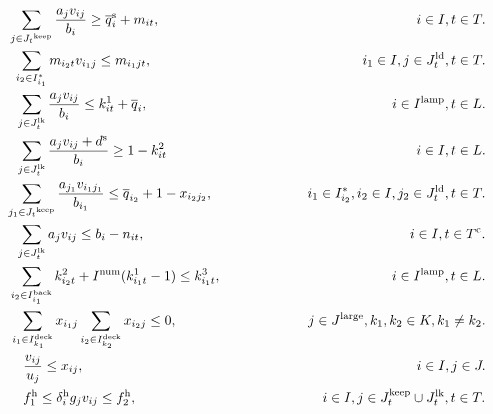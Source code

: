 \begin{center}
\begin{align}
&\hspace{1.8em} \sum_{j \in {J_t}^{\rm{keep}}} \frac{a_{j} v_{ij}} {b_{i}} \geq \overline{q}_{i}^{\rm{s}} + {m_{it}}, \hspace{18.76em} i \in I, t \in T. \\
&\hspace{2.2em} \sum_{i_2 \in {I_{i_1}^*}} {m_{i_2t} v_{i_1j}} \leq {m_{i_1jt}}, \hspace{15.4em} i_1 \in I, j \in J_{t}^{\rm{ld}}, t \in T. \\
&\hspace{2.35em} \sum_{j \in J_{t}^{\rm{lk}}} \frac{a_{j} v_{ij}} {b_{i}} \leq k^1_{it} + \overline{q}_{i}, \hspace{17.85em} i \in I^{\rm{lamp}}, t \in L. \\
&\hspace{2.35em} \sum_{j \in J_{t}^{\rm{lk}}} \frac{a_{j} v_{ij} + d^{\rm{s}}} {b_{i}}  \geq 1 - k^2_{it}  \hspace{18.28em} i \in I, t \in L. \\
&\hspace{1.65em} \sum_{j_1\in {J_t}^{\rm{keep}}} \frac{a_{j_1} v_{i_1j_1}} {b_{i_1}} \leq \overline{q}_{i_2} + 1 - {x_{i_2j_2}}, \hspace{6.91em} i_1 \in {I_{i_2}^*}, i_2 \in I, j_2 \in J_{t}^{\rm{ld}}, t \in T. \\
&\hspace{2.35em} \sum_{j \in J_{t}^{\rm{lk}}} a_j v_{ij}  \leq b_{i} - n_{it}, \hspace{19.37em} i \in I, t \in T^{\rm{c}}. \\
&\hspace{1.83em} \sum_{i_2 \in I_{i_1}^{\rm{back}}} k^2_{i_2t} + I^{\rm{num}} (k^1_{i_1t} - 1) \leq  k^3_{i_1t}, \hspace{12.48em} i \in I^{\rm{lamp}}, t \in L. \\
&\hspace{1.93em} \sum_{i_1 \in I_{k_{1}}^{\rm{deck}}} x_{i_1j} \sum_{i_2 \in I_{k_{2}}^{\rm{deck}}} x_{i_2j} \leq 0, \hspace{9.56em} j \in J^{\rm{large}}, k_1, k_2 \in K, k_1 \neq k_2. \\
&\hspace{2.9em} \frac{v_{ij}} {u_j} \leq x_{ij}, \hspace{24.33em} i \in I, j \in J. \\
&\hspace{2.9em} {f^{\rm{h}}_1} \leq {\delta_{i}^{\rm{h}}}{g_{j}} {v_{ij}} \leq f^{\rm{h}}_2, \hspace{13.57em} i \in I, j \in J_{t}^{\rm{keep}} \cup J_{t}^{\rm{lk}}, t \in T. \\

\end{align}
\end{center}
